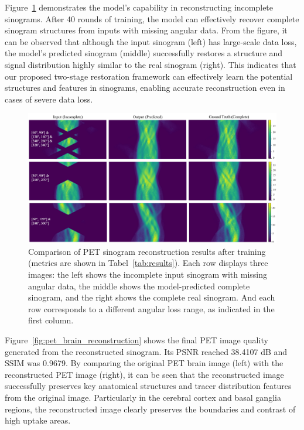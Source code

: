 \documentclass[12pt]{iopart}
\begin{document}
Figure~\ref{fig:pet_reconstruction_results} demonstrates the model's capability in reconstructing incomplete sinograms. After 40 rounds of training, the model can effectively recover complete sinogram structures from inputs with missing angular data. From the figure, it can be observed that although the input sinogram (left) has large-scale data loss, the model's predicted sinogram (middle) successfully restores a structure and signal distribution highly similar to the real sinogram (right). This indicates that our proposed two-stage restoration framework can effectively learn the potential structures and features in sinograms, enabling accurate reconstruction even in cases of severe data loss.
\begin{figure}[ht]
    \centering
    \includegraphics[width=\textwidth]{Images/sinograms.pdf}
    \vspace{-1cm}
    \caption{Comparison of PET sinogram reconstruction results after training (metrics are shown in Tabel~\ref{tab:results}). Each row displays three images: the left shows the incomplete input sinogram with missing angular data, the middle shows the model-predicted complete sinogram, and the right shows the complete real sinogram. And each row corresponds to a different angular loss range, as indicated in the first column. }
    \label{fig:pet_reconstruction_results}
\end{figure}
Figure~\ref{fig:pet_brain_reconstruction} shows the final PET image quality generated from the reconstructed sinogram. Its PSNR reached 38.4107 dB and SSIM was 0.9679. By comparing the original PET brain image (left) with the reconstructed PET image (right), it can be seen that the reconstructed image successfully preserves key anatomical structures and tracer distribution features from the original image. Particularly in the cerebral cortex and basal ganglia regions, the reconstructed image clearly preserves the boundaries and contrast of high uptake areas. 
\end{document}
